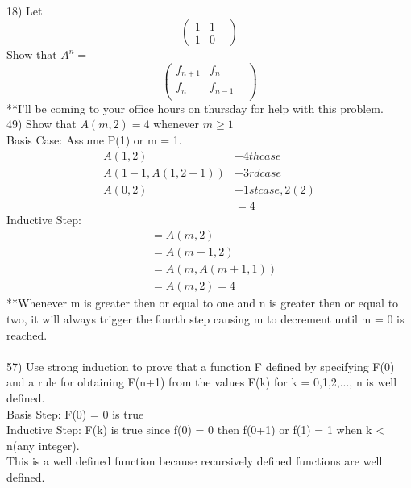 \documentclass{article}
\begin{document}
\begin{flushleft}
~\\
\setlength\parindent{0pt}18) Let \\
\[
\left(
\begin{array}{ccc}
  1&   1&   \\
  1&   0& 
\end{array}
\right)
\]
Show that $A^n = $ \\
\[
\left(
\begin{array}{ccc}
  f_{n+1}&   f_n&   \\
  f_n&   f_{n-1}&   \\
  &   &   
\end{array}
\right)
\]
**I'll be coming to your office hours on thursday for help with this problem.
~\\
\setlength\parindent{0pt}49) Show that $A(m,2) = 4$ whenever $m \geq 1$ \\
\setlength\parindent{24pt}Basis Case: Assume P(1) or m = 1.
\begin{align*}
A(1, 2) &- 4th case \\
A(1-1, A(1, 2-1)) &- 3rd case \\
A(0, 2) &- 1st case, 2(2) \\
&= 4
\end{align*}
Inductive Step:
\begin{align*}
&= A(m, 2) \\
&= A(m+1,2) \\
&= A(m, A(m+1, 1)) \\
&= A(m, 2) = 4
\end{align*}
**Whenever m is greater then or equal to one and n is greater then or equal to two, it will always trigger the fourth step causing m to decrement until m = 0 is reached. \\
~\\
\setlength\parindent{0pt}57) Use strong induction to prove that a function F defined by specifying F(0) and a rule for obtaining F(n+1) from the values F(k) for k = 0,1,2,..., n is well defined. \\
Basis Step: F(0) = 0 is true \\
Inductive Step: F(k) is true since f(0) = 0 then f(0+1) or f(1) = 1 when k < n(any integer).  \\
This is a well defined function because recursively defined functions are well defined.  \\


\end{flushleft}
\end{document}
